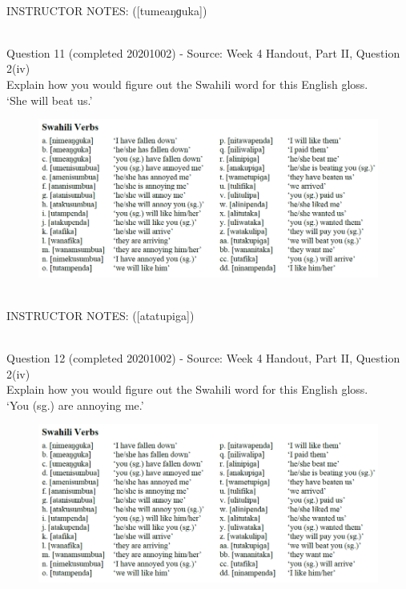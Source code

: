 \documentclass[12pt]{article}
\begin{document}
~\\
INSTRUCTOR NOTES: ([tumeaŋɡuka])


~\\

{\large Question 11} (completed 20201002) - Source: Week 4 Handout, Part II, Question 2(iv)\\

Explain how you would figure out the Swahili word for this English gloss.\\

‘She will beat us.’

\begin{figure}[H]
\includegraphics{../images/swahiliverbs.png}
\end{figure}

~\\
INSTRUCTOR NOTES: ([atatupiga])


~\\

{\large Question 12} (completed 20201002) - Source: Week 4 Handout, Part II, Question 2(iv)\\

Explain how you would figure out the Swahili word for this English gloss.\\

‘You (sg.) are annoying me.’

\begin{figure}[H]
\includegraphics{../images/swahiliverbs.png}
\end{figure}
\end{document}
